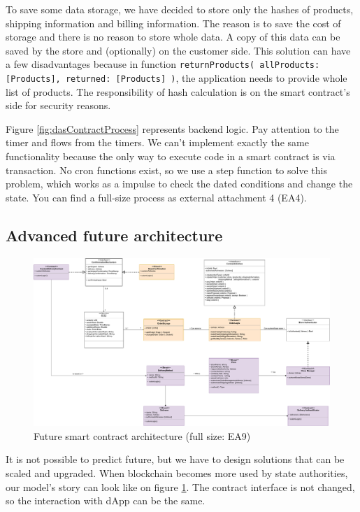 \documentclass[thesis=M,english]{FITthesis}[2019/12/23]
\begin{document}
To save some data storage, we have decided to store only the hashes of products, shipping information and billing information. The reason is to save the cost of storage and there is no reason to store whole data. A copy of this data can be saved by the store and (optionally) on the customer side. This solution can have a few disadvantages because in function \texttt{returnProducts( allProducts: [Products], returned: [Products] )}, the application needs to provide whole list of products. The responsibility of hash calculation is on the smart contract's side for security reasons. 

Figure \ref{fig:dasContractProcess} represents backend logic. Pay attention to the timer and flows from the timers. We can't implement exactly the same functionality because the only way to execute code in a smart contract is via transaction. No cron functions exist, so we use a step function to solve this problem, which works as a impulse to check the dated conditions and change the state. You can find a full-size process as external attachment 4 (EA4).

\label{advancedFutureArchitecture}
\subsection{Advanced future architecture}

\begin{figure}[ht!]
    \centering
    \includegraphics[width=\textwidth]{assets/SmartContractArchitecture-2_1.pdf}
    \caption{Future smart contract architecture  (full size: EA9) }
    \label{fig:futureSCarchitecture}
\end{figure}


It is not possible to predict future, but we have to design solutions that can be scaled and upgraded. When blockchain becomes more used by state authorities, our model's story can look like on figure \ref{fig:futureSCarchitecture}. The contract interface is not changed, so the interaction with dApp can be the same. 
\end{document}
